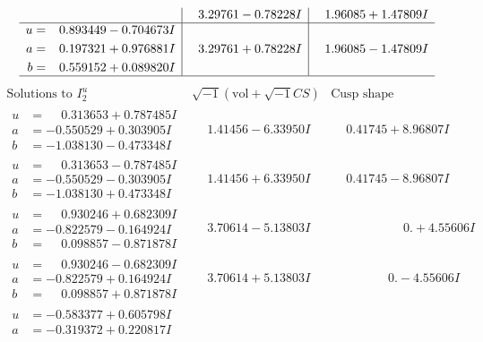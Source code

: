 \documentclass[1p]{elsarticle_modified}
\theoremstyle{definition}
\newcommand{\I}{\sqrt{-1}}
\begin{document}
$$\begin{array}{c|c|c}
 & \phantom{-}3.29761 - 0.78228 I & \phantom{-}1.96085 + 1.47809 I \\ \hline\begin{aligned}
u &= \phantom{-}0.893449 - 0.704673 I \\
a &= \phantom{-}0.197321 + 0.976881 I \\
b &= \phantom{-}0.559152 + 0.089820 I\end{aligned}
 & \phantom{-}3.29761 + 0.78228 I & \phantom{-}1.96085 - 1.47809 I\\
 \hline 
 \end{array}$$\newpage$$\begin{array}{c|c|c}  
\text{Solutions to }I^u_{2}& \I (\text{vol} + \sqrt{-1}CS) & \text{Cusp shape}\\
 \hline 
\begin{aligned}
u &= \phantom{-}0.313653 + 0.787485 I \\
a &= -0.550529 + 0.303905 I \\
b &= -1.038130 - 0.473348 I\end{aligned}
 & \phantom{-}1.41456 - 6.33950 I & \phantom{-}0.41745 + 8.96807 I \\ \hline\begin{aligned}
u &= \phantom{-}0.313653 - 0.787485 I \\
a &= -0.550529 - 0.303905 I \\
b &= -1.038130 + 0.473348 I\end{aligned}
 & \phantom{-}1.41456 + 6.33950 I & \phantom{-}0.41745 - 8.96807 I \\ \hline\begin{aligned}
u &= \phantom{-}0.930246 + 0.682309 I \\
a &= -0.822579 - 0.164924 I \\
b &= \phantom{-}0.098857 - 0.871878 I\end{aligned}
 & \phantom{-}3.70614 - 5.13803 I & \phantom{-0.000000 -}0. + 4.55606 I \\ \hline\begin{aligned}
u &= \phantom{-}0.930246 - 0.682309 I \\
a &= -0.822579 + 0.164924 I \\
b &= \phantom{-}0.098857 + 0.871878 I\end{aligned}
 & \phantom{-}3.70614 + 5.13803 I & \phantom{-0.000000 } 0. - 4.55606 I \\ \hline\begin{aligned}
u &= -0.583377 + 0.605798 I \\
a &= -0.319372 + 0.220817 I \\

\end{aligned}
\end{array}$$
\end{document}
